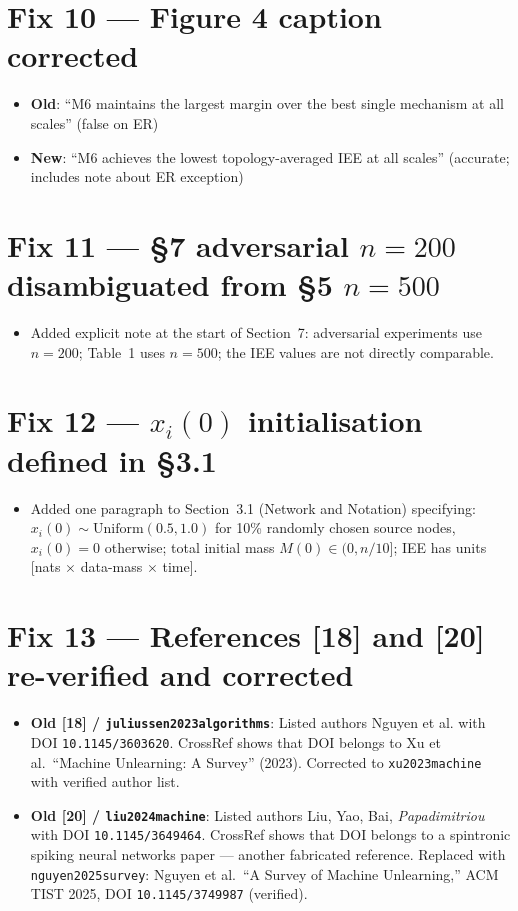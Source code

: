\documentclass[11pt,a4paper]{article}
\begin{document}
\section*{Fix 10 — Figure 4 caption corrected}

\begin{itemize}
\item \textbf{Old}: ``M6 maintains the largest margin over the best single
  mechanism at all scales'' (false on ER)
\item \textbf{New}: ``M6 achieves the lowest topology-averaged IEE at all
  scales'' (accurate; includes note about ER exception)
\end{itemize}

\section*{Fix 11 — §7 adversarial $n=200$ disambiguated from §5 $n=500$}

\begin{itemize}
\item Added explicit note at the start of Section~7: adversarial experiments
  use $n=200$; Table~1 uses $n=500$; the IEE values are not directly comparable.
\end{itemize}

\section*{Fix 12 — $x_i(0)$ initialisation defined in §3.1}

\begin{itemize}
\item Added one paragraph to Section~3.1 (Network and Notation) specifying:
  $x_i(0) \sim \mathrm{Uniform}(0.5,1.0)$ for 10\% randomly chosen source nodes,
  $x_i(0)=0$ otherwise; total initial mass $M(0) \in (0, n/10]$;
  IEE has units [nats $\times$ data-mass $\times$ time].
\end{itemize}

\section*{Fix 13 — References [18] and [20] re-verified and corrected}

\begin{itemize}
\item \textbf{Old [18] / \texttt{juliussen2023algorithms}}: Listed authors
  Nguyen et al. with DOI \texttt{10.1145/3603620}.  CrossRef shows that DOI
  belongs to Xu et al.\ ``Machine Unlearning: A Survey'' (2023).
  Corrected to \texttt{xu2023machine} with verified author list.
\item \textbf{Old [20] / \texttt{liu2024machine}}: Listed authors Liu,
  Yao, Bai, \emph{Papadimitriou} with DOI \texttt{10.1145/3649464}.
  CrossRef shows that DOI belongs to a spintronic spiking neural networks
  paper — another fabricated reference.  Replaced with
  \texttt{nguyen2025survey}: Nguyen et al.\ ``A Survey of Machine
  Unlearning,'' ACM TIST 2025, DOI \texttt{10.1145/3749987} (verified).
\end{itemize}
\end{document}
